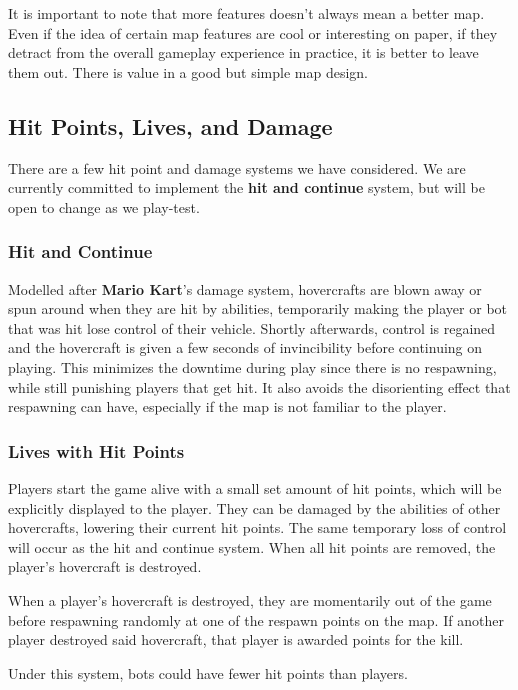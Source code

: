 \documentclass{article}
\theoremstyle{definition}
\begin{document}
It is important to note that more features doesn't always mean a better map.
Even if the idea of certain map features are cool or interesting on paper, if
they detract from the overall gameplay experience in practice, it is better to
leave them out. There is value in a good but simple map design.

\subsection{Hit Points, Lives, and Damage}

There are a few hit point and damage systems we have considered. We are
currently committed to implement the \textbf{hit and continue} system, but will
be open to change as we play-test.

\subsubsection{Hit and Continue}

Modelled after \textbf{Mario Kart}'s damage system, hovercrafts are blown away or
spun around when they are hit by abilities, temporarily making the player or
bot that was hit lose control of their vehicle. Shortly afterwards, control is
regained and the hovercraft is given a few seconds of invincibility before
continuing on playing. This minimizes the downtime during play since there is
no respawning, while still punishing players that get hit. It also avoids the
disorienting effect that respawning can have, especially if the map is not
familiar to the player.

\subsubsection{Lives with Hit Points}

Players start the game alive with a small set amount of hit points, which will
be explicitly displayed to the player. They can be damaged by the abilities of
other hovercrafts, lowering their current hit points. The same temporary loss
of control will occur as the hit and continue system. When all hit points are
removed, the player's hovercraft is destroyed.

When a player's hovercraft is destroyed, they are momentarily out of the game
before respawning randomly at one of the respawn points on the map. If another
player destroyed said hovercraft, that player is awarded points for the kill.

Under this system, bots could have fewer hit points than players.
\end{document}
